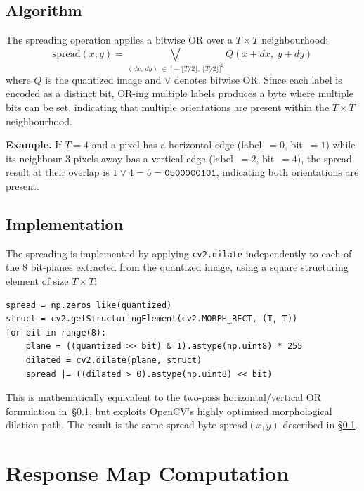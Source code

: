 \documentclass[12pt,a4paper]{article}
\begin{document}
\subsection{Algorithm}
\label{sec:spreading_alg}
The spreading operation applies a bitwise OR over a $T \times T$ neighbourhood:
\begin{equation}
  \text{spread}(x,y)
  = \bigvee_{(dx,\,dy)\;\in\;
             \bigl[-\lfloor T/2\rfloor,\,\lfloor T/2\rfloor\bigr]^{2}}
    Q(x+dx,\;y+dy)
\end{equation}
where $Q$ is the quantized image and $\vee$ denotes bitwise OR.  Since each label is
encoded as a distinct bit, OR-ing multiple labels produces a byte where multiple bits
can be set, indicating that multiple orientations are present within the
$T \times T$ neighbourhood.

\textbf{Example.}  If $T=4$ and a pixel has a horizontal edge (label~$=0$,
bit~$=1$) while its neighbour 3 pixels away has a vertical edge (label~$=2$,
bit~$=4$), the spread result at their overlap is
$1 \vee 4 = 5 = \texttt{0b00000101}$, indicating both orientations are present.

\subsection{Implementation}
The spreading is implemented by applying \texttt{cv2.dilate} independently to
each of the 8 bit-planes extracted from the quantized image, using a square
structuring element of size $T \times T$:

\begin{lstlisting}[style=python, caption={Bit-plane dilation spreading}]
spread = np.zeros_like(quantized)
struct = cv2.getStructuringElement(cv2.MORPH_RECT, (T, T))
for bit in range(8):
    plane = ((quantized >> bit) & 1).astype(np.uint8) * 255
    dilated = cv2.dilate(plane, struct)
    spread |= ((dilated > 0).astype(np.uint8) << bit)
\end{lstlisting}

This is mathematically equivalent to the two-pass horizontal/vertical OR
formulation in~§\ref{sec:spreading_alg}, but exploits OpenCV's highly optimised
morphological dilation path.  The result is the same spread byte
$\text{spread}(x,y)$ described in §\ref{sec:spreading_alg}.

\section{Response Map Computation}
\end{document}
